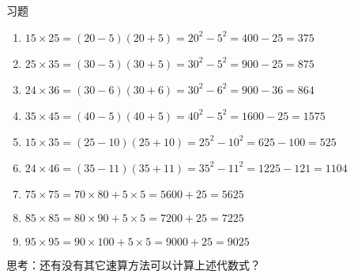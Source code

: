 \documentclass[aspectratio=169]{ctexbeamer} %
\begin{document}
\begin{frame}[t]{习题}
\begin{spacing}{1.2}
\normalsize
\begin{enumerate}[label={\arabic*.}]
\item $15 \times 25 =  (20-5)(20+5) = 20^2-5^2 = 400-25 = 375$
\item $25 \times 35 =  (30-5)(30+5) = 30^2-5^2 = 900-25 = 875$
\item $24 \times 36 =  (30-6)(30+6) = 30^2-6^2 = 900-36 = 864$
\item $35 \times 45 =  (40-5)(40+5) = 40^2-5^2 = 1600-25 = 1575$
\item $15 \times 35 =  (25-10)(25+10) = 25^2-10^2 = 625-100 = 525$
\item $24 \times 46 =  (35-11)(35+11) = 35^2-11^2 = 1225-121 = 1104$
\item $75 \times 75 =  70 \times 80 + 5 \times 5 = 5600 + 25 = 5625$
\item $85 \times 85 =  80 \times 90 + 5 \times 5 = 7200 + 25 = 7225$
\item $95 \times 95 =  90 \times 100 + 5 \times 5 = 9000 + 25 = 9025$
\end{enumerate}
\alert{思考：还有没有其它速算方法可以计算上述代数式？}
\end{spacing}
\end{frame}
\end{document}
